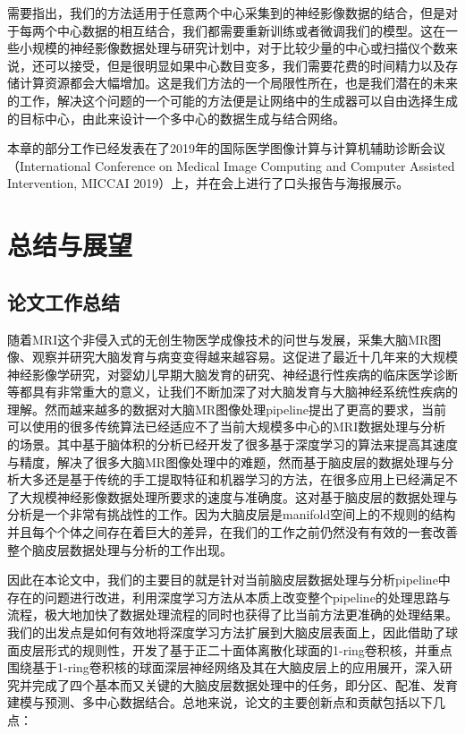 需要指出，我们的方法适用于任意两个中心采集到的神经影像数据的结合，但是对于每两个中心数据的相互结合，我们都需要重新训练或者微调我们的模型。这在一些小规模的神经影像数据处理与研究计划中，对于比较少量的中心或扫描仪个数来说，还可以接受，但是很明显如果中心数目变多，我们需要花费的时间精力以及存储计算资源都会大幅增加。这是我们方法的一个局限性所在，也是我们潜在的未来的工作，解决这个问题的一个可能的方法便是让网络中的生成器可以自由选择生成的目标中心，由此来设计一个多中心的数据生成与结合网络。

本章的部分工作已经发表在了2019年的国际医学图像计算与计算机辅助诊断会议（International Conference on Medical Image Computing and Computer Assisted Intervention, MICCAI 2019）上，并在会上进行了口头报告与海报展示。










\chapter{总结与展望}

\section{论文工作总结}
随着MRI这个非侵入式的无创生物医学成像技术的问世与发展，采集大脑MR图像、观察并研究大脑发育与病变变得越来越容易。这促进了最近十几年来的大规模神经影像学研究，对婴幼儿早期大脑发育的研究、神经退行性疾病的临床医学诊断等都具有非常重大的意义，让我们不断加深了对大脑发育与大脑神经系统性疾病的理解。然而越来越多的数据对大脑MR图像处理pipeline提出了更高的要求，当前可以使用的很多传统算法已经适应不了当前大规模多中心的MRI数据处理与分析的场景。其中基于脑体积的分析已经开发了很多基于深度学习的算法来提高其速度与精度，解决了很多大脑MR图像处理中的难题，然而基于脑皮层的数据处理与分析大多还是基于传统的手工提取特征和机器学习的方法，在很多应用上已经满足不了大规模神经影像数据处理所要求的速度与准确度。这对基于脑皮层的数据处理与分析是一个非常有挑战性的工作。因为大脑皮层是manifold空间上的不规则的结构并且每个个体之间存在着巨大的差异，在我们的工作之前仍然没有有效的一套改善整个脑皮层数据处理与分析的工作出现。

因此在本论文中，我们的主要目的就是针对当前脑皮层数据处理与分析pipeline中存在的问题进行改进，利用深度学习方法从本质上改变整个pipeline的处理思路与流程，极大地加快了数据处理流程的同时也获得了比当前方法更准确的处理结果。我们的出发点是如何有效地将深度学习方法扩展到大脑皮层表面上，因此借助了球面皮层形式的规则性，开发了基于正二十面体离散化球面的1-ring卷积核，并重点围绕基于1-ring卷积核的球面深层神经网络及其在大脑皮层上的应用展开，深入研究并完成了四个基本而又关键的大脑皮层数据处理中的任务，即分区、配准、发育建模与预测、多中心数据结合。总地来说，论文的主要创新点和贡献包括以下几点：

